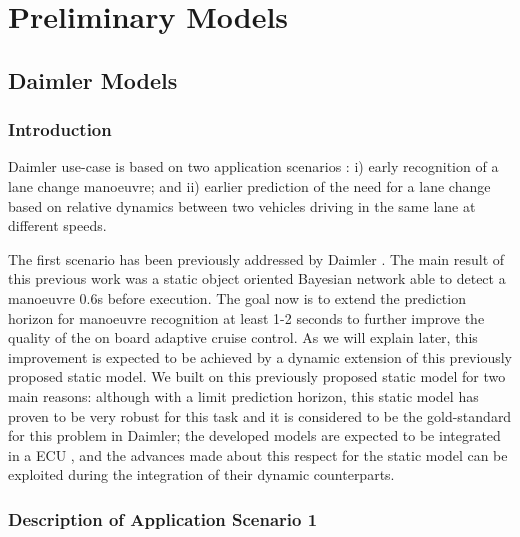 \section{Preliminary Models}
\subsection{Daimler Models}

\subsubsection{Introduction}

Daimler use-case is based on two application scenarios \cite{Fer14}: i) early recognition of a lane change manoeuvre; and ii) earlier prediction of the need for a lane change based on relative dynamics between two vehicles driving in the same lane at different speeds. 

The first scenario has been previously addressed by Daimler \cite{kasper2012object}. The main result of this previous work was a static object oriented Bayesian network \cite{koller1997object} able to detect a manoeuvre 0.6s before execution. The goal now is to extend the prediction horizon for manoeuvre recognition at least 1-2 seconds to further improve the quality of the on board adaptive cruise control. As we will explain later, this improvement is expected to be achieved by a dynamic extension of this previously proposed static model. We built on this previously proposed static model for two main reasons: although with a limit prediction horizon, this static model has proven to be very robust for this task and it is considered to be the gold-standard for this problem in Daimler; the developed models are expected to be integrated in a ECU \cite{Fer14}, and the advances made about this respect for the static model \cite{Weidl2014} can be exploited during the integration of their dynamic counterparts. 



\subsubsection*{Description of Application Scenario 1}

